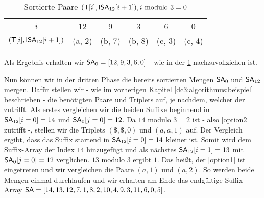 \begin{table}[H]
	\centering
	\begin{tabular}{c| c c c c c}
		$i$ & 12 & 9 & 3 & 6 & 0 \\
		$(\inputtext[i], \isa_{12}[i+1])$  & (a, 2) & (b, 7) & (b, 8) & (c, 3) &  (c, 4)
	\end{tabular}
	\caption{Sortierte Paare $(\inputtext[i], \isa_{12}[i+1]), i \text{ modulo } 3 = 0$}
	\label{tab:SA01}
\end{table}

Als Ergebnis erhalten wir $\sa_{0} = [12, 9, 3, 6, 0]$ - wie in der \cref{tab:SA01} nachzuvollziehen ist.

Nun können wir in der dritten Phase die bereits sortierten Mengen $\sa_{0}$ und $\sa_{12}$ mergen. Dafür stellen wir - wie im vorherigen Kapitel \ref{dc3:algorithmus:beispiel} beschrieben - die benötigten Paare und Triplets auf, je nachdem, welcher der  zutrifft. Als erstes vergleichen wir die beiden Suffixe beginnend in $\sa_{12}[i = 0] = 14$ und $\sa_{0}[j = 0] = 12$. Da $14$ modulo $3 = 2$ ist - also \cref{option2} zutrifft -, stellen wir die Triplets $(\$,\$,0)$ und $(a,a,1)$ auf. Der Vergleich ergibt, dass das Suffix startend in $\sa_{12}[i = 0] = 14$ kleiner ist. Somit wird dem Suffix-Array \sa der Index $14$ hinzugefügt und als nächstes $\sa_{12}[i = 1] = 13$ mit $\sa_{0}[j = 0] = 12$ verglichen. $13$ modulo $3$ ergibt $1$. Das heißt, der \cref{option1} ist eingetreten und wir vergleichen die Paare $(a,1)$ und $(a, 2)$. So werden beide Mengen einmal durchlaufen und wir erhalten am Ende das endgültige Suffix-Array $\sa = [14, 13, 12, 7, 1, 8, 2, 10, 4, 9, 3, 11, 6, 0, 5]$.